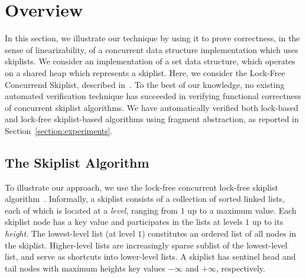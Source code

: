 \section{Overview}
\label{sec:overview}

  In this section, we illustrate our technique by using it to prove correctness, in
the sense of linearizability, of
a concurrent data structure implementation which uses skiplists.
We consider an implementation of a set data structure, which operates on
a shared heap which represents a skiplist. Here, we consider the
Lock-Free Concurrend Skiplist, described in~\cite[Section 14.4]{ArtOfMpP}.
To the best of our knowledge, no existing automated verification technique
has succeeded in verifying functional correctness of concurrent
skiplist algorithms.
We have automatically verified both lock-based and lock-free skiplist-based algorithms using fragment
abstraction, as reported in Section~\ref{section:experiments}.


\subsection{The Skiplist Algorithm}
  
To illustrate our approach, we use the lock-free concurrent lock-free skiplist algorithm~\cite[Section 14.4]{ArtOfMpP}. Informally, a skiplist consists of a collection of sorted linked lists, each of which is located at a {\em level}, ranging from $1$ up to a maximum value. Each skiplist node has a key value and participates in the lists at levels $1$ up to its {\em height}.
The lowest-level list (at level $1$) constitutes an ordered list of all nodes
in the skiplist. Higher-level lists are increasingly sparse sublist of the
lowest-level list, and serve as shortcuts into lower-level lists.
A skiplist has sentinel head and tail nodes with maximum heights key values $-\infty$ and $+\infty$, respectively. %
% 

